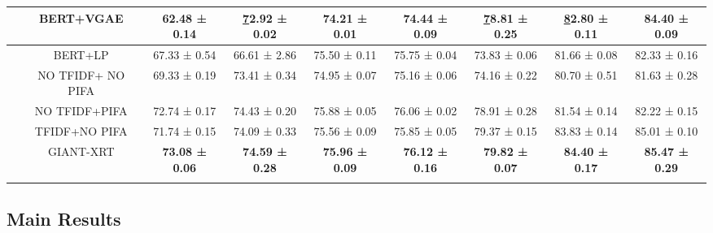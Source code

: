 \documentclass{article} \usepackage{iclr2022_conference,times}
\begin{document}
\begin{table}[t!]
\begin{tabular}{@{}cccccc|ccc@{}}
 &
  BERT+VGAE &
  62.48 ± 0.14 &
  {\ul 72.92 ± 0.02} &
  74.21 ± 0.01 &
  74.44 ± 0.09 &
  {\ul 78.81 ± 0.25} &
  {\ul 82.80 ± 0.11} &
  84.40 ± 0.09 \\ \midrule
\multicolumn{1}{l}{\multirow{5}{*}{}} &
  BERT+LP &
  67.33 ± 0.54 &
  66.61 ± 2.86 &
  75.50 ± 0.11 &
  75.75 ± 0.04 &
  73.83 ± 0.06 &
  81.66 ± 0.08 &
  82.33 ± 0.16 \\ \cmidrule(l){2-9} 
\multicolumn{1}{l}{} &
  NO TFIDF+ NO PIFA &
  69.33 ± 0.19 &
  73.41 ± 0.34 &
  74.95 ± 0.07 &
  75.16 ± 0.06 &
  74.16 ± 0.22 &
  80.70 ± 0.51 &
  81.63 ± 0.28 \\
\multicolumn{1}{l}{} &
  NO TFIDF+PIFA &
  72.74 ± 0.17 &
  74.43 ± 0.20 &
  75.88 ± 0.05 &
  76.06 ± 0.02 &
  78.91 ± 0.28 &
  81.54 ± 0.14 &
  82.22 ± 0.15 \\
\multicolumn{1}{l}{} &
  TFIDF+NO PIFA &
  71.74 ± 0.15 &
  74.09 ± 0.33 &
  75.56 ± 0.09 &
  75.85 ± 0.05 &
  79.37 ± 0.15 &
  83.83 ± 0.14 &
  85.01 ± 0.10 \\
\multicolumn{1}{l}{} &
  GIANT-XRT &
  \textbf{73.08 ± 0.06} &
  \textbf{74.59 ± 0.28} &
  \textbf{75.96 ± 0.09} &
  \textbf{76.12 ± 0.16} &
  \textbf{79.82 ± 0.07} &
  \textbf{84.40 ± 0.17} &
  \textbf{85.47 ± 0.29} \\
  \bottomrule
  \vspace{-2em}
\end{tabular}


\vspace{-0.2cm}
\end{table}


\subsection{Main Results}
\end{document}
